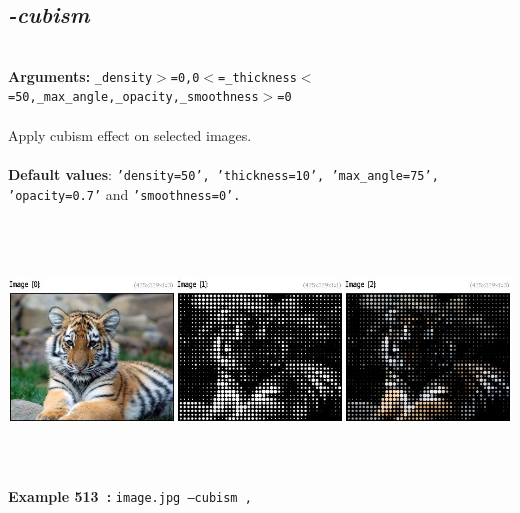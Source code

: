 \documentclass[a4paper,11pt,twoside]{book}
\begin{document}
\subsection{\emph{-cubism} }\vspace*{-0.5em}
~\\\textbf{Arguments: } 
{\small \texttt{\_density$>$=0,0$<$=\_thickness$<$=50,\_max\_angle,\_opacity,\_smoothness$>$=0}}\\~\\
Apply cubism effect on selected images.
~\\~\\\textbf{Default values}: {\small \texttt{'density=50', 'thickness=10', 'max\_angle=75', 'opacity=0.7'} and \texttt{'smoothness=0'.}}
\begin{center}\includegraphics[keepaspectratio=true,height=7cm,width=\textwidth]{img/gmic_def513.jpg}\\
{\footnotesize \textbf{Example 513~:} \texttt{image.jpg --cubism ,}}
\end{center}
\end{document}
